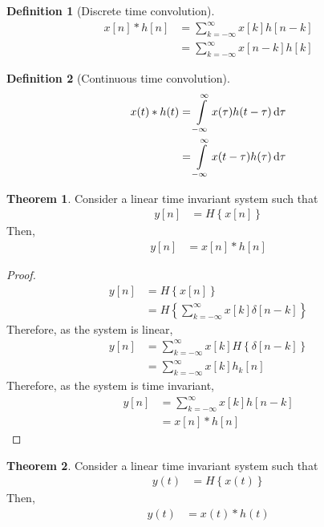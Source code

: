 \documentclass[titlepage, fleqn, a4paper, 12pt, twoside]{article}
\theoremstyle{definition}
\newtheorem{definition}{Definition}
\theoremstyle{theorem}
\newtheorem{theorem}{Theorem}
\begin{document}
\begin{definition}[Discrete time convolution]
	\begin{align*}
		x[n] \ast h[n] & = \sum\limits_{k = -\infty}^{\infty} x[k] h[n - k] \\
                               & = \sum\limits_{k = -\infty}^{\infty} x[n - k] h[k]
	\end{align*}
\end{definition}

\begin{definition}[Continuous time convolution]
	\begin{align*}
		x(t) \ast h(t) & = \int\limits_{-\infty}^{\infty} x(\tau) h(t - \tau) \dif \tau \\
                               & = \int\limits_{-\infty}^{\infty} x(t - \tau) h(\tau) \dif \tau
	\end{align*}
\end{definition}

\begin{theorem}
	Consider a linear time invariant system such that
	\begin{align*}
		y[n] & = H\left\{ x[n] \right\}
	\end{align*}
	Then,
	\begin{align*}
		y[n] & = x[n] \ast h[n]
	\end{align*}
\end{theorem}

\begin{proof}
	\begin{align*}
		y[n] & = H\left\{ x[n] \right\} \\
                     & = H\left\{ \sum\limits_{k = -\infty}^{\infty} x[k] \delta[n - k] \right\}
	\end{align*}
	Therefore, as the system is linear,
	\begin{align*}
		y[n] & = \sum\limits_{k = -\infty}^{\infty} x[k] H\left\{ \delta[n - k] \right\} \\
                     & = \sum\limits_{k = -\infty}^{ \infty} x[k] h_k[n]
	\end{align*}
	Therefore, as the system is time invariant,
	\begin{align*}
		y[n] & = \sum\limits_{k = -\infty}^{\infty} x[k] h[n - k] \\
                     & = x[n] \ast h[n]
	\end{align*}
\end{proof}

\begin{theorem}
	Consider a linear time invariant system such that
	\begin{align*}
		y(t) & = H\left\{ x(t) \right\}
	\end{align*}
	Then,
	\begin{align*}
		y(t) & = x(t) \ast h(t)
	\end{align*}
\end{theorem}
\end{document}
